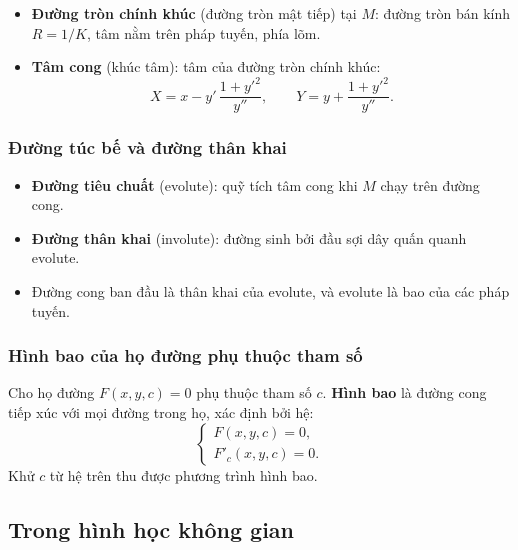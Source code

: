 \documentclass[12pt,a4paper]{article}
\begin{document}
\begin{dinhnghia}
  \begin{itemize}
    \item \textbf{Đường tròn chính khúc} (đường tròn mật tiếp) tại $M$: đường tròn bán kính $R = 1/K$, tâm nằm trên pháp tuyến, phía lõm.
    \item \textbf{Tâm cong} (khúc tâm): tâm của đường tròn chính khúc:
      \[
        X = x - y'\,\dfrac{1 + y'^2}{y''}, \qquad Y = y + \dfrac{1 + y'^2}{y''}.
      \]
  \end{itemize}
\end{dinhnghia}

\subsubsection{Đường túc bế và đường thân khai}

\begin{dinhnghia}
  \begin{itemize}
    \item \textbf{Đường tiêu chuất} (evolute): quỹ tích tâm cong khi $M$ chạy trên đường cong.
    \item \textbf{Đường thân khai} (involute): đường sinh bởi đầu sợi dây quấn quanh evolute.
    \item Đường cong ban đầu là thân khai của evolute, và evolute là bao của các pháp tuyến.
  \end{itemize}
\end{dinhnghia}

\subsubsection{Hình bao của họ đường phụ thuộc tham số}

\begin{dinhnghia}
  Cho họ đường $F(x, y, c) = 0$ phụ thuộc tham số $c$. \textbf{Hình bao} là đường cong tiếp xúc với mọi đường trong họ, xác định bởi hệ:
  \[
    \begin{cases} F(x, y, c) = 0, \\ F'_c(x, y, c) = 0. \end{cases}
  \]
  Khử $c$ từ hệ trên thu được phương trình hình bao.
\end{dinhnghia}

\subsection{Trong hình học không gian}
\end{document}

